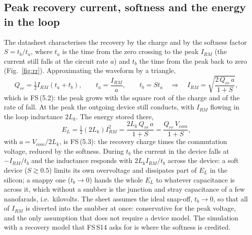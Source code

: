 \documentclass[10pt,a4paper]{scrartcl}
\newcommand{\Lk}{L_{k}}
\newcommand{\fs}[1]{\textsf{FS}\,(#1)}
\newcommand{\fsS}[1]{\textsf{FS}\,#1}
\begin{document}
\subsection{Peak recovery current, softness and the energy in the loop}\label{sec:triangle}
The datasheet characterises the recovery by the charge and by the softness factor $S = t_b/t_a$, where $t_a$ is the time from the zero crossing to the peak $I_{RM}$ (the current still falls at the circuit rate $a$) and $t_b$ the time from the peak back to zero (Fig.~\ref{fig:rr}). Approximating the waveform by a triangle,
\begin{equation}
Q_{rr} = \tfrac12 I_{RM}(t_a+t_b), \qquad t_a = \frac{I_{RM}}{a}, \qquad t_b = St_a
\quad\Rightarrow\quad
I_{RM} = \sqrt{\frac{2\,Q_{rr}\,a}{1+S}} ,
\label{eq:IRMderiv}
\end{equation}
which is \fs{5.2}: the peak grows with the square root of the charge and of the rate of fall. At the peak the outgoing device still conducts, with $I_{RM}$ flowing in the loop inductance $2\Lk$. The energy stored there,
\begin{equation}
E_L = \tfrac12(2\Lk)I_{RM}^2 = \frac{2\Lk\,Q_{rr}\,a}{1+S} = \frac{Q_{rr}\,V_{com}}{1+S} ,
\label{eq:ELderiv}
\end{equation}
with $a = V_{com}/2\Lk$, is \fs{5.3}: the recovery charge times the commutation voltage, reduced by the softness. During $t_b$ the current in the device falls at $-I_{RM}/t_b$ and the inductance responds with $2\Lk I_{RM}/t_b$ across the device: a soft device ($S\gtrsim0.5$) limits its own overvoltage and dissipates part of $E_L$ in the silicon; a snappy one ($t_b\to0$) hands the whole $E_L$ to whatever capacitance is across it, which without a snubber is the junction and stray capacitance of a few nanofarads, i.e.\ kilovolts. The sheet assumes the ideal snap-off, $t_b\to0$, so that all of $I_{RM}$ is diverted into the snubber at once: conservative for the peak voltage, and the only assumption that does not require a device model. The simulation with a recovery model that \fsS{S14} asks for is where the softness is credited.
\end{document}
